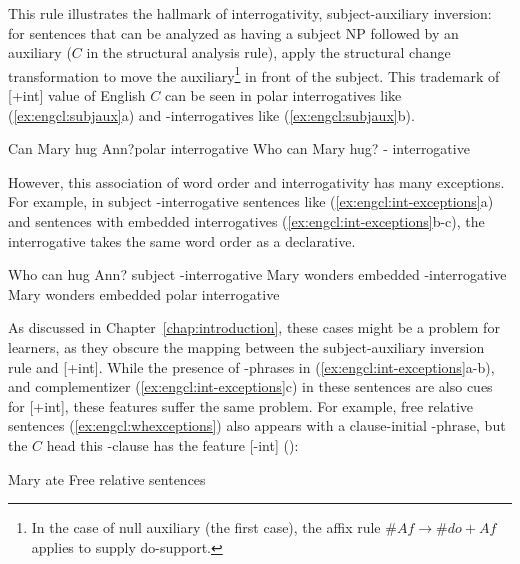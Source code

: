 This rule illustrates the hallmark of interrogativity, subject-auxiliary inversion: for sentences that can be analyzed as having a subject NP followed by an auxiliary ($C$ in the structural analysis rule), apply the structural change transformation to move the auxiliary\footnote{In the case of null auxiliary (the first case), the affix rule $\#Af\rightarrow \# do+ Af$ applies to supply do-support.} in front of the subject. This trademark of [+int] value of English $C$ can be seen in polar interrogatives like  (\ref{ex:engcl:subjaux}a) and \twh-interrogatives like (\ref{ex:engcl:subjaux}b). 

\bxl{}
Can Mary hug Ann?\hfill polar interrogative
\ex
Who can Mary hug? \hfill \twh-
interrogative
\exl
\eex


However, this association of word order and interrogativity has many exceptions. For example, in subject \twh-interrogative sentences like (\ref{ex:engcl:int-exceptions}a) and sentences with embedded interrogatives (\ref{ex:engcl:int-exceptions}b-c), the interrogative takes the same word order as a declarative. 

\bxl{}
Who can hug Ann? \hfill subject \twh-interrogative
\ex
Mary wonders  \hfill embedded \twh-interrogative
\ex 
Mary wonders  \hfill embedded polar interrogative
\exl
\eex

As discussed in Chapter~\ref{chap:introduction}, these cases might be a problem for learners, as they obscure the mapping between the subject-auxiliary inversion rule and [+int]. While the presence of \twh-phrases in (\ref{ex:engcl:int-exceptions}a-b), and complementizer  (\ref{ex:engcl:int-exceptions}c) in these sentences are also cues for [+int], these features suffer the same problem. For example, free relative sentences (\ref{ex:engcl:whexceptions}) also appears with a clause-initial \twh-phrase, but the $C$ head this \twh-clause has the feature [-int] (\cite{bresnan1978free, caponigro2003free}):

Mary ate  \hfill Free relative sentences
\eex



